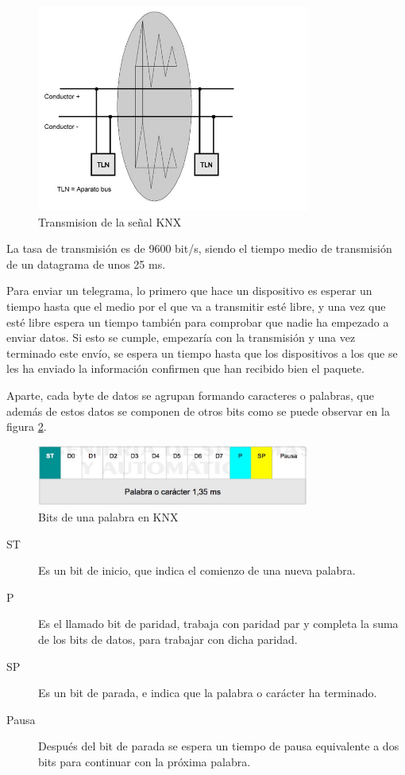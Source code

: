\begin{figure}[ht]
	\centering
		\includegraphics[width=0.8\textwidth]{imagenes/topologia-knx.jpg}
	\caption{Transmision de la señal KNX}
	\label{fig:transmisionknx}
\end{figure}



La tasa de transmisión es de 9600 bit/s, siendo el tiempo medio de transmisión de un datagrama de unos 25 ms.


Para enviar un telegrama, lo primero que hace un dispositivo es esperar un tiempo hasta que el medio por el que va a transmitir esté libre, y una vez que esté libre espera un tiempo también para comprobar que nadie ha empezado a enviar datos. Si esto se cumple, empezaría con la transmisión y una vez terminado este envío, se espera un tiempo hasta que los dispositivos a los que se les ha enviado la información confirmen que han recibido bien el paquete. 



Aparte, cada byte de datos se agrupan formando caracteres o palabras, que adem\'as de estos datos se componen de otros bits como se puede observar en la figura \ref{fig:palabra_knx}.
\begin{figure}[htbp]
	\centering
		\includegraphics[width=0.80\textwidth]{imagenes/palabra_knx.jpg}
	\caption{Bits de una palabra en KNX}
	\label{fig:palabra_knx}
\end{figure}


\begin{description}
	\item[ST]Es un bit de inicio, que indica el comienzo de una nueva palabra.
	\item[P]Es el llamado bit de paridad, trabaja con paridad par y completa la suma de los bits de datos, para trabajar con dicha paridad.
	\item[SP]Es un bit de parada, e indica que la palabra o carácter ha terminado.
	\item[Pausa]Después del bit de parada se espera un tiempo de pausa equivalente a dos bits para continuar con la próxima palabra.
\end{description}

